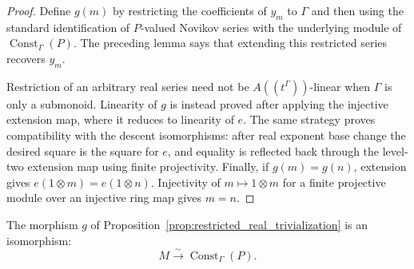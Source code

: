 \begin{proof}
  \leanok
  Define $g(m)$ by restricting the coefficients of $y_m$ to $\Gamma$ and then
  using the standard identification of $P$-valued Novikov series with the
  underlying module of $\operatorname{Const}_\Gamma(P)$.  The preceding lemma
  says that extending this restricted series recovers $y_m$.

  Restriction of an arbitrary real series need not be
  $A((t^\Gamma))$-linear when $\Gamma$ is only a submonoid.  Linearity of $g$
  is instead proved after applying the injective extension map, where it
  reduces to linearity of $e$.  The same strategy proves compatibility with
  the descent isomorphisms: after real exponent base change the desired square
  is the square for $e$, and equality is reflected back through the
  level-two extension map using finite projectivity.  Finally, if
  $g(m)=g(n)$, extension gives $e(1\otimes m)=e(1\otimes n)$.  Injectivity of
  $m\mapsto1\otimes m$ for a finite projective module over an injective ring
  map gives $m=n$.
\end{proof}

\begin{proposition}
  \label{prop:restricted_real_trivialization_iso}
  \leanok
  The morphism $g$ of
  Proposition~\ref{prop:restricted_real_trivialization} is an isomorphism:
  \[
    M\xrightarrow{\sim}\operatorname{Const}_\Gamma(P).
  \]
\end{proposition}


